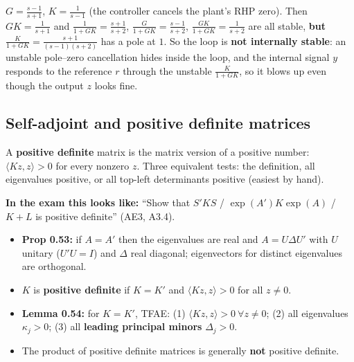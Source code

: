 \begin{exambox}[title={Why we need all four (a classic exam trap)}]
$G=\frac{s-1}{s+1}$, $K=\frac{1}{s-1}$ (the controller cancels the plant's RHP zero). Then $GK=\frac1{s+1}$ and
$\frac1{1+GK}=\frac{s+1}{s+2}$, $\frac{G}{1+GK}=\frac{s-1}{s+2}$, $\frac{GK}{1+GK}=\frac{1}{s+2}$ are all stable, \textbf{but}
$\frac{K}{1+GK}=\frac{s+1}{(s-1)(s+2)}$ has a pole at $1$. So the loop is \textbf{not internally stable}: an unstable pole--zero cancellation hides inside the loop, and the internal signal $y$ responds to the reference $r$ through the unstable $\frac{K}{1+GK}$, so it blows up even though the output $z$ looks fine.
\end{exambox}

\subsection{Self-adjoint and positive definite matrices \texorpdfstring{}{}}\label{sec:posdef}\label{ss:5-8}
\begin{plainbox}
A \textbf{positive definite} matrix is the matrix version of a positive number: $\langle Kz,z\rangle>0$ for every nonzero $z$.
Three equivalent tests: the definition, all eigenvalues positive, or all top-left determinants positive (easiest by hand).
\par\smallskip\textbf{In the exam this looks like:} ``Show that $S'KS$ / $\exp(A')K\exp(A)$ / $K+L$ is positive definite'' (AE3, A3.4).
\end{plainbox}
\begin{thmbox}
\begin{itemize}
\item \textbf{Prop 0.53:} if $A=A'$ then the eigenvalues are real and $A=U\Delta U'$ with $U$ unitary ($U'U=I$) and $\Delta$ real diagonal; eigenvectors for distinct eigenvalues are orthogonal.
\item $K$ is \textbf{positive definite} if $K=K'$ and $\langle Kz,z\rangle>0$ for all $z\neq0$.
\item \textbf{Lemma 0.54:} for $K=K'$, TFAE: (1) $\langle Kz,z\rangle>0\ \forall z\neq0$; (2) all eigenvalues $\kappa_j>0$; (3) all \textbf{leading principal minors} $\Delta_j>0$.
\item The product of positive definite matrices is generally \textbf{not} positive definite.
\end{itemize}
\end{thmbox}

